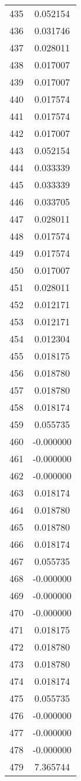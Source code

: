 \documentclass[12pt]{article}
\begin{document}
\begin{longtable}{@{}cc@{}}
435 & 0.052154 \\
436 & 0.031746 \\
437 & 0.028011 \\
438 & 0.017007 \\
439 & 0.017007 \\
440 & 0.017574 \\
441 & 0.017574 \\
442 & 0.017007 \\
443 & 0.052154 \\
444 & 0.033339 \\
445 & 0.033339 \\
446 & 0.033705 \\
447 & 0.028011 \\
448 & 0.017574 \\
449 & 0.017574 \\
450 & 0.017007 \\
451 & 0.028011 \\
452 & 0.012171 \\
453 & 0.012171 \\
454 & 0.012304 \\
455 & 0.018175 \\
456 & 0.018780 \\
457 & 0.018780 \\
458 & 0.018174 \\
459 & 0.055735 \\
460 & -0.000000 \\
461 & -0.000000 \\
462 & -0.000000 \\
463 & 0.018174 \\
464 & 0.018780 \\
465 & 0.018780 \\
466 & 0.018174 \\
467 & 0.055735 \\
468 & -0.000000 \\
469 & -0.000000 \\
470 & -0.000000 \\
471 & 0.018175 \\
472 & 0.018780 \\
473 & 0.018780 \\
474 & 0.018174 \\
475 & 0.055735 \\
476 & -0.000000 \\
477 & -0.000000 \\
478 & -0.000000 \\
479 & 7.365744 \\

\end{longtable}
\end{document}
